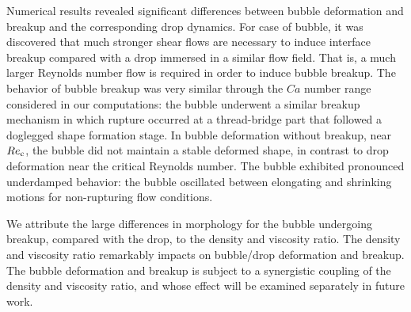 \documentclass[%
 reprint,
 showkeys,
 amsmath,amssymb,
 aps,
 prfluids,
 onecolumn
]{revtex4-2}
\begin{document}
Numerical results revealed significant differences between bubble deformation
and breakup and the corresponding drop dynamics.  For case of bubble, it was
discovered that much stronger shear flows are necessary to induce interface
breakup compared with a drop immersed in a similar flow field.  That is, a much
larger Reynolds number flow is required in order to induce bubble breakup.  The
behavior of bubble breakup was very similar through the $Ca$ number range
considered in our computations: the bubble underwent a similar breakup
mechanism in which rupture occurred at a thread-bridge part that followed a
doglegged shape formation stage.  In bubble deformation without breakup, near
$Re_{\rm c}$, the bubble did not maintain a stable deformed shape, in contrast to
drop deformation near the critical Reynolds number.  The bubble exhibited
pronounced underdamped behavior: the bubble oscillated between elongating and
shrinking motions for non-rupturing flow conditions.

We attribute the large differences in morphology for the bubble undergoing
breakup, compared with the drop, to the density and viscosity ratio.  The
density and viscosity ratio remarkably impacts on bubble/drop deformation and
breakup.  The bubble deformation and breakup is subject to a synergistic
coupling of the density and viscosity ratio, and whose effect will be examined
separately in future work.




\end{document}
